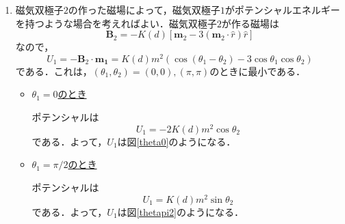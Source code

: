 \documentclass[a4paper,pdflatex,ja=standard]{bxjsarticle}
\begin{document}
\begin{enumerate}
  \item 
  磁気双極子$2$の作った磁場によって，磁気双極子$1$がポテンシャルエネルギーを持つような場合を考えればよい．磁気双極子$2$が作る磁場は
  \begin{equation}
    \bm{B}_{2}
    =
    -K(d)
    \left[ 
    \bm{m}_{2}
    -
    3(\bm{m}_{2}\cdot\hat{r})\hat{r}
    \right]
  \end{equation}
  なので，
  \begin{equation}
    U_{1}
    =
    -\bm{B}_{2}\cdot\bm{m_{1}}
    =
    K(d)m^2
    \left(
    \cos(\theta_{1}-\theta_{2})
    -
    3\cos\theta_{1}\cos\theta_{2}
    \right)
  \end{equation}
  である．これは，$(\theta_{1},\theta_{2})=(0,0),(\pi,\pi)$のときに最小である．

  \begin{itemize}
    \item
    \uline{$\theta_{1}=0$のとき}

    ポテンシャルは
    \begin{equation}
      U_{1}
      =
      -2K(d)m^2 \cos\theta_{2}
    \end{equation}    
    である．よって，$U_1$は図\ref{theta0}のようになる．
    
    \item 
    \uline{$\theta_{1}=\pi/2$のとき}

    ポテンシャルは
    \begin{equation}
      U_{1}
      =
      K(d)m^2 \sin\theta_{2}
    \end{equation}    
    である．よって，$U_1$は図\ref{thetapi2}のようになる．


\end{itemize}
\end{enumerate}
\end{document}
